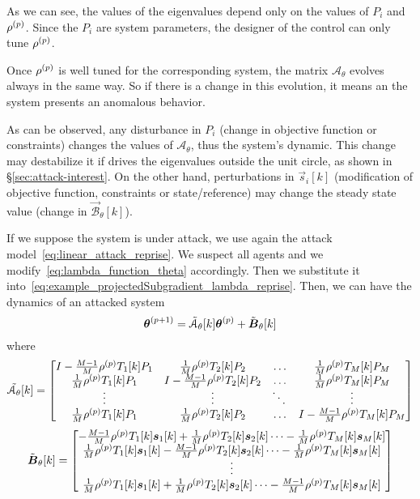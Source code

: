 \documentclass[../main.tex]{subfiles}
\begin{document}
As we can see, the values of the eigenvalues depend only on the values of $P_{i}$ and $\rho^{(p)}$.
Since the $P_{i}$ are system parameters, the designer of the control can only tune $\rho^{(p)}$.

Once $\rho^{(p)}$ is well tuned for the corresponding system, the matrix $\mathcal{A}_{\theta}$ evolves always in the same way.
So if there is a change in this evolution, it means an the system presents an anomalous behavior.

As can be observed, any disturbance in $P_{i}$ (change in objective function or constraints) changes the values of $\mathcal{A}_{\theta}$, thus the system's dynamic. This change may destabilize it if drives the eigenvalues outside the unit circle, as shown in \S\ref{sec:attack-interest}.
On the other hand, perturbations in $\vec{s}_{i}[k]$ (modification of objective function, constraints or state/reference) may change the steady state value (change in $\mathcal{\vec{B}}_{\theta}[k]$).

If we suppose the system is under attack, we use again the attack model~\eqref{eq:linear_attack_reprise}.
We suspect all agents and we modify~\eqref{eq:lambda_function_theta} accordingly. Then we substitute it into~\eqref{eq:example_projectedSubgradient_lambda_reprise}.
Then, we can have the dynamics of an attacked system
\begin{equation}
  \label{eq:negotiation_equation_substituting_organizing_tilde}
  \boldsymbol{\theta}^{(p+1)}=\tilde{\mathcal{A}}_{\theta}[k]\boldsymbol{\theta}^{(p)}+\tilde{\mathcal{\boldsymbol{B}}}_{\theta}[k]
\end{equation}
where
\begin{equation}
\tilde{\mathcal{A}_{\theta}}[k]=\left[
\begin{matrix}
I-\frac{M-1}{M}\rho\p T_{1}[k]P_{1} & \frac{1}{M}\rho\p T_{2}[k]P_{2}&\dots&\frac{1}{M}\rho\p T_{M}[k]P_{M}\\
\frac{1}{M}\rho\p T_{1}[k]P_{1}&I-\frac{M-1}{M}\rho\p T_{2}[k]P_{2}&\dots&\frac{1}{M}\rho\p T_{M}[k]P_{M}\\
\vdots&\vdots&\ddots&\vdots\\
\frac{1}{M}\rho\p T_{1}[k]P_{1}&\frac{1}{M}\rho\p T_{2}[k]P_{2}&\dots&I-\frac{M-1}{M}\rho\p T_{M}[k]P_{M}\\
\end{matrix}
\right]
\end{equation}
\begin{equation}
\tilde{\mathcal{\vec{B}}}_{\theta}[k]=\left[
\begin{matrix}
-\frac{M-1}{M}\rho\p T_{1}[k]\vec{s}_{1}[k]+\frac{1}{M}\rho\p T_{2}[k]\vec{s}_{2}[k]\dots-\frac{1}{M}\rho\p T_{M}[k]\vec{s}_{M}[k]\\
\frac{1}{M}\rho\p T_{1}[k]\vec{s}_{1}[k]-\frac{M-1}{M}\rho\p T_{2}[k]\vec{s}_{2}[k] \dots-\frac{1}{M}\rho\p T_{M}[k]\vec{s}_{M}[k]\\
\vdots\\
\frac{1}{M}\rho\p T_{1}[k]\vec{s}_{1}[k]+\frac{1}{M}\rho\p T_{2}[k]\vec{s}_{2}[k]\dots-\frac{M-1}{M}\rho\p T_{M}[k]\vec{s}_{M}[k]\\
\end{matrix}
\right]
\end{equation}
\end{document}
